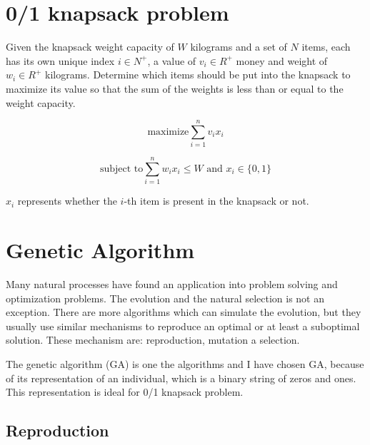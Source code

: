 \documentclass{article}
\begin{document}

\section*{0/1 knapsack problem} %

 Given the knapsack weight capacity of $W$ kilograms and a set of $N$ items, each has its own unique index $i \in N^+$, a value of $v_i \in R^+$ money and weight of $w_i \in R^+$ kilograms. Determine which items should be put into the knapsack to maximize its value so that the sum of the weights is less than or equal to the weight capacity.

\begin{equation}
	\text{maximize}\sum_{i=1}^{n}{v_ix_i}
\end{equation}


\begin{equation}
	\text{subject to}\sum_{i=1}^{n}{w_ix_i} \leq W \text{ and }  x_i \in \{0,1\}
\end{equation}
\begin{info}
	$x_i$ represents whether the $i$-th item is present in the knapsack or not.
\end{info}
\clearpage

\section{Genetic Algorithm}
	Many natural processes have found an application into problem solving and optimization problems. The evolution and the natural selection is not an exception. There are more algorithms which can simulate the evolution, but they usually use similar mechanisms to reproduce an optimal or at least a suboptimal solution. These mechanism are: reproduction, mutation a selection. 

	The genetic algorithm (GA) is one the algorithms and I have chosen GA, because of its representation of an individual, which is a binary string of zeros and ones. This representation is ideal for 0/1 knapsack problem.


	\subsection{Reproduction}
\end{document}
